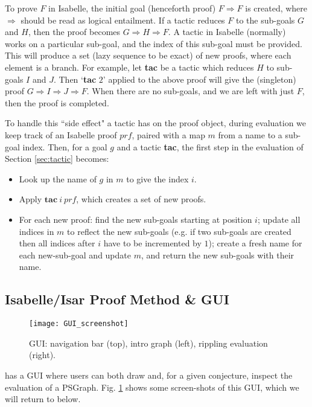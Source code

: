 \documentclass{llncs}
\begin{document}
To prove $F$ in Isabelle, the initial goal (henceforth proof) 
$F \Longrightarrow F$ is 
created, where $\Longrightarrow$ should be read as logical entailment.
If a tactic reduces $F$ to the sub-goals $G$ and $H$, then the proof  
becomes $G \Longrightarrow H \Longrightarrow F$. A tactic in Isabelle (normally) works on a particular sub-goal, and the index of this sub-goal must be provided. This will produce a set (lazy sequence to be exact) of new proofs, where each element is a branch. For example, let \textbf{tac} be a tactic which reduces $H$ to sub-goals $I$ and $J$. Then `\textbf{tac} $2$' applied to the above proof will give the (singleton) proof $G \Longrightarrow I \Longrightarrow J \Longrightarrow F$. When there are no sub-goals,
and we are left with just $F$, then the proof is completed. 

To handle this ``side effect" a tactic has on the proof object, during evaluation we keep track of an Isabelle proof $\textit{prf}$, paired with a map $m$ from a name to a sub-goal index. Then, for a goal $g$ and a tactic \textbf{tac},
the first step in the evaluation of Section \ref{sec:tactic} becomes:
\begin{itemize}
\item Look up the name of $g$ in $m$ to give the index $i$.
\item Apply $\textbf{tac}~i~\textit{prf}$, which creates a set of new proofs.
\item For each new proof: find the new sub-goals starting at position $i$; update all indices in $m$ to reflect the new sub-goals (e.g. if two sub-goals are created then all indices after $i$ have to be incremented by $1$); create a fresh name for each new-sub-goal and update $m$, and return the new sub-goals with their name.
\end{itemize}

\beforesection
\subsection{Isabelle/Isar Proof Method \& GUI}
\aftersection

\begin{figure}
\centering
\texttt{[image: GUI\_screenshot]}
\caption{GUI:  navigation bar (top), intro graph (left), rippling evaluation (right).} \label{fig:gui}
\vspace{-5mm}
\end{figure}

\psgraphtool{} has a GUI where users can both draw and, for a given conjecture, 
inspect the evaluation of a PSGraph.  Fig. \ref{fig:gui} shows some screen-shots 
of this GUI, which we will return to below. 
\end{document}
